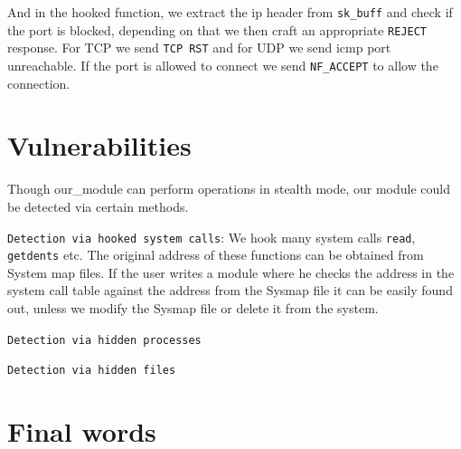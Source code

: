 \documentclass[10pt, letterpaper]{scrartcl}
\begin{document}
And in the hooked function, we extract the ip header from \texttt{sk\_buff} and check if the port is blocked, depending on that we then craft an appropriate \texttt{REJECT} response. For TCP we send \texttt{TCP RST} and for UDP we send icmp port unreachable. If the port is allowed to connect we send \texttt{NF\_ACCEPT} to allow the connection.

\section{Vulnerabilities}
Though our\_module can perform operations in stealth mode, our module could be detected via certain methods. 

\texttt{Detection via hooked system calls}: We hook many system calls \texttt{read}, \texttt{getdents} etc. 
The original address of these functions can be obtained from System map files. 
If the user writes a module where he checks the address in the system call table against the address from the Sysmap file it can be easily found out, unless we modify the Sysmap file or delete it from the system. 

\texttt{Detection via hidden processes}

\texttt{Detection via hidden files}

\section{Final words}
\end{document}
